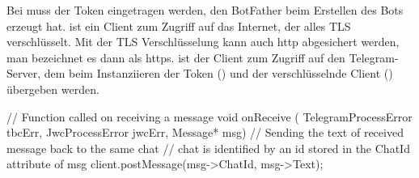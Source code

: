 \begin{multicols}{2}
Bei  muss der Token eingetragen werden, den BotFather beim Erstellen des Bots erzeugt hat.
 ist ein Client zum Zugriff auf das Internet, der alles TLS verschlüsselt. Mit der
TLS Verschlüsselung kann auch http abgesichert werden, man bezeichnet es dann als https.
 ist der Client zum Zugriff auf den Telegram-Server, dem beim Instanziieren der
Token () und der verschlüsselnde Client () übergeben werden.

\end{multicols}
\begin{src}
// Function called on receiving a message
void onReceive (
  TelegramProcessError tbcErr, 
  JwcProcessError jwcErr, 
  Message* msg)
{
    // Sending the text of received message back to the same chat
    // chat is identified by an id stored in the ChatId attribute of msg
    client.postMessage(msg->ChatId, msg->Text);
}
\end{src}
